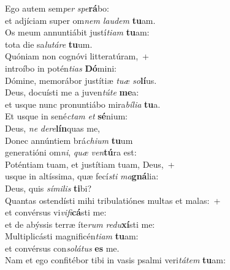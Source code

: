 \evenverse Ego autem sem\textit{per} \textit{spe}\textbf{rá}bo:~\*\\
\evenverse et adjíciam super om\textit{nem} \textit{lau}\textit{dem} \textbf{tu}am.\\
\oddverse Os meum annuntiábit justí\textit{ti}\textit{am} \textbf{tu}am:~\*\\
\oddverse tota die sa\textit{lu}\textit{tá}\textit{re} \textbf{tu}um.\\
\evenverse Quóniam non cognóvi litteratúram,~+\\
\evenverse  introíbo in potén\textit{ti}\textit{as} \textbf{Dó}mini:~\*\\
\evenverse Dómine, memorábor justítiæ \textit{tu}\textit{æ} \textit{so}\textbf{lí}us.\\
\oddverse Deus, docuísti me a juven\textit{tú}\textit{te} \textbf{me}a:~\*\\
\oddverse et usque nunc pronuntiábo mira\textit{bí}\textit{li}\textit{a} \textbf{tu}a.\\
\evenverse Et usque in sené\textit{ctam} \textit{et} \textbf{sé}nium:~\*\\
\evenverse Deus, \textit{ne} \textit{de}\textit{re}\textbf{lín}quas me,\\
\oddverse Donec annúntiem brá\textit{chi}\textit{um} \textbf{tu}um~\*\\
\oddverse generatióni om\textit{ni}, \textit{quæ} \textit{ven}\textbf{tú}ra est:\\
\evenverse Poténtiam tuam, et justítiam tuam, Deus,~+\\
\evenverse  usque in altíssima, quæ fecí\textit{sti} \textit{ma}\textbf{gná}lia:~\*\\
\evenverse Deus, quis \textit{sí}\textit{mi}\textit{lis} \textbf{ti}bi?\\
\oddverse Quantas ostendísti mihi tribulatiónes multas et malas:~+\\
\oddverse  et convérsus vi\textit{vi}\textit{fi}\textbf{cá}sti me:~\*\\
\oddverse et de abýssis terræ íte\textit{rum} \textit{re}\textit{du}\textbf{xí}sti me:\\
\evenverse Multiplicásti magnificén\textit{ti}\textit{am} \textbf{tu}am:~\*\\
\evenverse et convérsus con\textit{so}\textit{lá}\textit{tus} \textbf{es} me.\\
\oddverse Nam et ego confitébor tibi in vasis psalmi veri\textit{tá}\textit{tem} \textbf{tu}am:~\*\\
